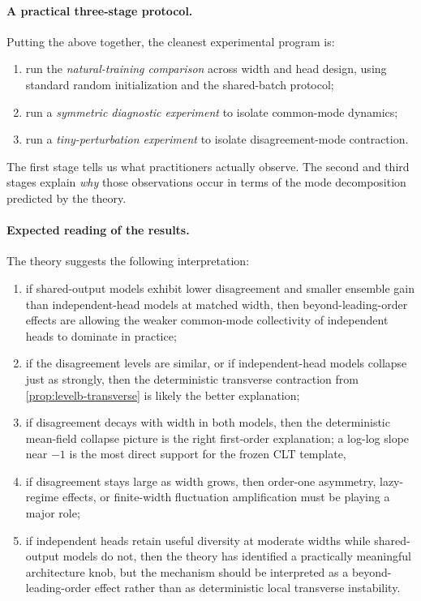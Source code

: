 \documentclass[11pt]{article}
\theoremstyle{definition}
\begin{document}
\paragraph{A practical three-stage protocol.}
Putting the above together, the cleanest experimental program is:
\begin{enumerate}[leftmargin=2em]
  \item run the \emph{natural-training comparison} across width and head design, using standard random initialization and the shared-batch protocol;
  \item run a \emph{symmetric diagnostic experiment} to isolate common-mode dynamics;
  \item run a \emph{tiny-perturbation experiment} to isolate disagreement-mode contraction.
\end{enumerate}
The first stage tells us what practitioners actually observe.
The second and third stages explain \emph{why} those observations occur in terms of the mode decomposition predicted by the theory.

\paragraph{Expected reading of the results.}
The theory suggests the following interpretation:
\begin{enumerate}[leftmargin=2em]
  \item if shared-output models exhibit lower disagreement and smaller ensemble gain than independent-head models at matched width,
  then beyond-leading-order effects are allowing the weaker common-mode collectivity of independent heads to dominate in practice;
  \item if the disagreement levels are similar, or if independent-head models collapse just as strongly, then the deterministic transverse contraction from \cref{prop:levelb-transverse} is likely the better explanation;
  \item if disagreement decays with width in both models,
  then the deterministic mean-field collapse picture is the right first-order explanation;
  a log-log slope near $-1$ is the most direct support for the frozen CLT template,
  \item if disagreement stays large as width grows, then order-one asymmetry, lazy-regime effects, or finite-width fluctuation amplification must be playing a major role;
  \item if independent heads retain useful diversity at moderate widths while shared-output models do not,
  then the theory has identified a practically meaningful architecture knob, but the mechanism should be interpreted as a beyond-leading-order effect rather than as deterministic local transverse instability.
\end{enumerate}
\end{document}
